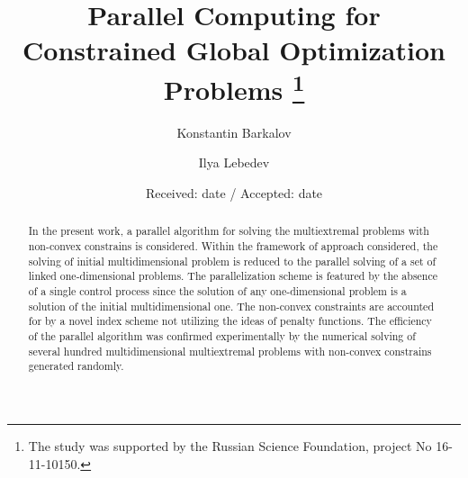 \documentclass[smallextended]{svjour3}       %
\begin{document}
\title{Parallel Computing for Constrained Global Optimization Problems
\thanks{The study was supported by the Russian Science Foundation, project No 16-11-10150.}
}


\author{Konstantin Barkalov          \and
        Ilya Lebedev %
}




\date{Received: date / Accepted: date}


\maketitle

\begin{abstract}
In the present work, a parallel algorithm for solving the multiextremal problems with non-convex constrains is considered. Within the framework of approach considered, the solving of initial multidimensional problem is reduced to the parallel solving of a set of linked one-dimensional problems. The parallelization scheme is featured by the absence of a single control process since the solution of any one-dimensional problem is a solution of the initial multidimensional one. The non-convex constraints are accounted for by a novel index scheme not utilizing the ideas of penalty functions. The efficiency of the parallel algorithm was confirmed experimentally by the numerical solving of several hundred multidimensional multiextremal problems with non-convex constrains generated randomly.
\end{abstract}
\end{document}
